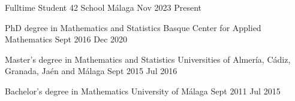 
		\nopagebreak	
		\begin{education} 
			{Fulltime Student}
			{42 School Málaga}
			{Nov 2023}
			{Present}
		\end{education}

		\begin{education} 
			{PhD degree in Mathematics and Statistics}
			{Basque Center for Applied Mathematics}
			{Sept 2016}
			{Dec 2020}
		\end{education}

		\begin{education} 
			{Master's degree in Mathematics and Statistics}
			{Universities of Almer\'ia, C\'adiz, Granada, Ja\'en and M\'alaga}
			{Sept 2015}
			{Jul 2016}
		\end{education}

		\begin{firsteducation} 
			{Bachelor's degree in Mathematics}
			{University of M\'alaga}
			{Sept 2011}
			{Jul 2015}
		\end{firsteducation}